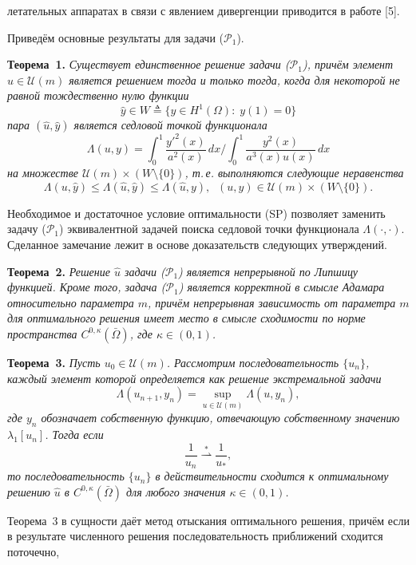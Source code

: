 летательных аппаратах в связи с явлением дивергенции
приводится в работе [5].
%
%
%
\par
Приведём основные результаты для задачи ($\mathcal{P}_1$).
\par
\textbf{Теорема~1.} {\it Существует единственное решение задачи \emph{($\mathcal{P}_1$)},
причём элемент $\hat{u} \in \mathcal{U}(m)$ является решением тогда и только тогда,
когда
для некоторой не равной тождественно нулю функции
\[
\hat{y} \in W \triangleq \{ y \in H^1(\Omega) : \; y(1) = 0 \}
\]
пара $(\hat{u}, \hat{y})$ является седловой точкой функционала
\[
\Lambda(u, y) = \int_0^1 \frac{y'^2(x)}{a^2(x)} \, dx \Bigg/
\int_0^1 \frac{y^2(x)}{a^3(x) u(x)} \, dx
\]
на множестве
$\mathcal{U}(m) \times \left(W \setminus \{ 0 \}\right)$,
т.\,е.
выполняются следующие неравенства}
\[
\Lambda(u, \hat{y})
\leq
\Lambda(\hat{u}, \hat{y})
\leq
\Lambda(\hat{u}, y),
\;\;
(u, y) \in \mathcal{U}(m) \times \left(W \setminus \{ 0 \}\right).
\tag{SP}
\]
%
%
%
\par
Необходимое и достаточное условие оптимальности (SP) позволяет заменить задачу ($\mathcal{P}_1$)
эквивалентной задачей поиска седловой точки функционала $\Lambda(\cdot, \cdot)$.
%
%
%
Сделанное замечание лежит в основе доказательств следующих утверждений.
%
%
%
\par
\textbf{Теорема~2.} {\it Решение $\hat{u}$ задачи \emph{($\mathcal{P}_1$)}
является непрерывной по Липшицу функцией.
%
%
%
Кроме того,
задача \emph{($\mathcal{P}_1$)} является корректной в смысле Адамара относительно параметра
$m$,
причём непрерывная зависимость от параметра $m$ для оптимального решения имеет место в смысле сходимости по норме пространства $C^{0,\kappa}(\bar{\Omega})$,
где $\kappa \in (0, 1)$.
}
%
%
%
\par
\textbf{Теорема~3.} {\it Пусть $u_0 \in \mathcal{U}(m)$.
%
%
%
Рассмотрим последовательность $\{ u_n \}$, каждый элемент которой определяется как решение
экстремальной задачи
\[
\Lambda(u_{n + 1}, y_n) = \sup_{u \in \mathcal{U}(m)} \Lambda(u, y_n),
\]
где
$y_n$ обозначает собственную функцию, отвечающую собственному значению $\lambda_1[u_n]$.
%
%
%
Тогда если
\[
\frac{1}{u_n}
\overset{*}{\rightharpoonup} \frac{1}{u_*},
\]
то последовательность $\{ u_n \}$ в действительности сходится
к оптимальному решению $\hat{u}$ в $C^{0,\kappa}(\bar{\Omega})$
для любого значения $\kappa \in (0, 1)$.
}
%
%
%
\par
Теорема~3 в сущности даёт метод отыскания оптимального решения,
причём если в результате численного решения последовательность приближений
сходится поточечно,
